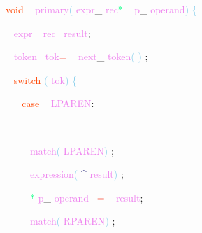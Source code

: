 \documentclass[8, usernames, dvipsnames]{beamer}
\begin{document}
\begin{frame}
\textcolor{OrangeRed}{void}
\textcolor{White}{\ }
\textcolor{Violet}{primary}\textcolor{SkyBlue}{(}
\textcolor{Violet}{expr}\textcolor{Sepia}{\_}
\textcolor{Violet}{rec}\textcolor{SpringGreen}{*}
\textcolor{White}{\ }
\textcolor{Violet}{p}\textcolor{Sepia}{\_}
\textcolor{Violet}{operand}\textcolor{SkyBlue}{)}
\textcolor{SkyBlue}{\{ }

 \textcolor{White}{\   }
\textcolor{Violet}{expr}\textcolor{Sepia}{\_}
\textcolor{Violet}{rec}\textcolor{White}{\ }
\textcolor{Violet}{result}\textcolor{Sepia}{;}

 \textcolor{White}{\   }
\textcolor{Violet}{token}\textcolor{White}{\ }
\textcolor{Violet}{tok}\textcolor{Salmon}{=}
\textcolor{White}{\ }
\textcolor{Violet}{next}\textcolor{Sepia}{\_}
\textcolor{Violet}{token}\textcolor{SkyBlue}{(}
\textcolor{SkyBlue}{)}
\textcolor{Sepia}{;}

 \textcolor{White}{\   }
\textcolor{OrangeRed}{switch}
\textcolor{SkyBlue}{(}
\textcolor{Violet}{tok}\textcolor{SkyBlue}{)}
\textcolor{SkyBlue}{\{ }

 \textcolor{White}{\   }
\textcolor{White}{\   }
\textcolor{OrangeRed}{case}
\textcolor{White}{\ }
\textcolor{Violet}{LPAREN}\textcolor{Sepia}{:}

 \textcolor{White}{\   }
\textcolor{White}{\   }
\textcolor{White}{\   }

 \textcolor{White}{\   }
\textcolor{White}{\   }
\textcolor{White}{\   }
\textcolor{Violet}{match}\textcolor{SkyBlue}{(}
\textcolor{Violet}{LPAREN}\textcolor{SkyBlue}{)}
\textcolor{Sepia}{;}

 \textcolor{White}{\   }
\textcolor{White}{\   }
\textcolor{White}{\   }
\textcolor{Violet}{expression}\textcolor{SkyBlue}{(}
\textcolor{MidnightBlue}{\textasciicircum}
\textcolor{Violet}{result}\textcolor{SkyBlue}{)}
\textcolor{Sepia}{;}

 \textcolor{White}{\   }
\textcolor{White}{\   }
\textcolor{White}{\   }
\textcolor{SpringGreen}{*}
\textcolor{Violet}{p}\textcolor{Sepia}{\_}
\textcolor{Violet}{operand}\textcolor{White}{\ }
\textcolor{Salmon}{=}
\textcolor{White}{\ }
\textcolor{Violet}{result}\textcolor{Sepia}{;}

 \textcolor{White}{\   }
\textcolor{White}{\   }
\textcolor{White}{\   }
\textcolor{Violet}{match}\textcolor{SkyBlue}{(}
\textcolor{Violet}{RPAREN}\textcolor{SkyBlue}{)}
\textcolor{Sepia}{;}

 \end{frame}
\end{document}
